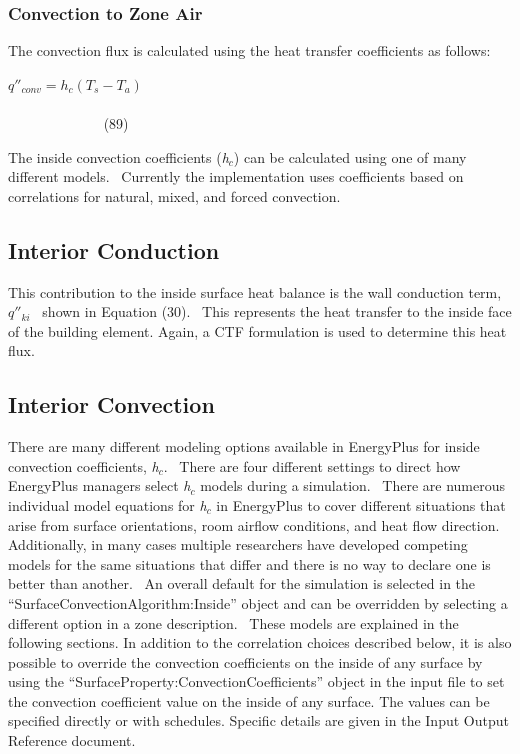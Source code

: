 \subsubsection{Convection to Zone Air}\label{convection-to-zone-air}

The convection flux is calculated using the heat transfer coefficients as follows:

\({q''_{conv}} = {h_c}({T_s} - {T_a})\) ~~~~~~~~~~~~~~~~~~~~~~~~~~~~~~~~~~~~~~~~~~~~~~~~~~~~~~~~~~~~~~~~~~~~~~~~~~~~~~~~~~~~~ (89)

The inside convection coefficients (\emph{h\(_{c}\)}) can be calculated using one of many different models.~ Currently the implementation uses coefficients based on correlations for natural, mixed, and forced convection.

\subsection{Interior Conduction}\label{interior-conduction}

This contribution to the inside surface heat balance is the wall conduction term, \({q''_{ki}}\) ~shown in Equation (30).~ This represents the heat transfer to the inside face of the building element. Again, a CTF formulation is used to determine this heat flux.

\subsection{Interior Convection}\label{interior-convection}

There are many different modeling options available in EnergyPlus for inside convection coefficients, \emph{h\(_{c}\)}.~ There are four different settings to direct how EnergyPlus managers select \emph{h\(_{c}\)} models during a simulation.~ There are numerous individual model equations for \emph{h\(_{c}\)} in EnergyPlus to cover different situations that arise from surface orientations, room airflow conditions, and heat flow direction.~ Additionally, in many cases multiple researchers have developed competing models for the same situations that differ and there is no way to declare one is better than another.~ An overall default for the simulation is selected in the ``SurfaceConvectionAlgorithm:Inside'' object and can be overridden by selecting a different option in a zone description.~ These models are explained in the following sections. In addition to the correlation choices described below, it is also possible to override the convection coefficients on the inside of any surface by using the ``SurfaceProperty:ConvectionCoefficients'' object in the input file to set the convection coefficient value on the inside of any surface. The values can be specified directly or with schedules. Specific details are given in the Input Output Reference document.

